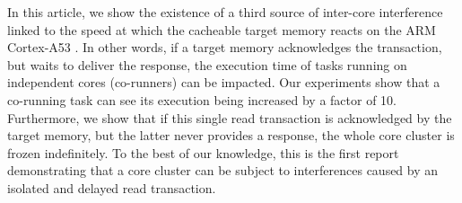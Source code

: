    In this article, we show the existence of a third source of inter-core interference linked to the speed at which the cacheable target memory reacts on the ARM Cortex-A53 \cite{ARM-cortex-A53}.
    In other words, if a target memory acknowledges the transaction, but waits to deliver the response, the execution time of tasks running on independent cores (co-runners) can be impacted.
    Our experiments show that a co-running task can see its execution being increased by a factor of 10.
    Furthermore, we show that if this single read transaction is acknowledged by the target memory, but the latter never provides a response, the whole core cluster is frozen indefinitely.
    To the best of our knowledge, this is the first report demonstrating that a core cluster can be subject to interferences caused by an isolated and delayed read transaction.
